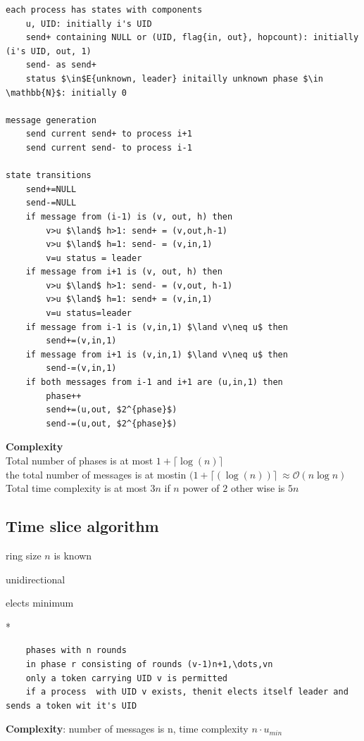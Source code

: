 \documentclass[ngerman,a4paper]{report}
\begin{document}
\begin{lstlisting}
each process has states with components
	u, UID: initially i's UID
	send+ containing NULL or (UID, flag{in, out}, hopcount): initially (i's UID, out, 1)
	send- as send+
	status $\in$E{unknown, leader} initailly unknown phase $\in \mathbb{N}$: initially 0

message generation
	send current send+ to process i+1
	send current send- to process i-1

state transitions
	send+=NULL
	send-=NULL
	if message from (i-1) is (v, out, h) then
		v>u $\land$ h>1: send+ = (v,out,h-1)
		v>u $\land$ h=1: send- = (v,in,1)
		v=u status = leader
	if message from i+1 is (v, out, h) then
		v>u $\land$ h>1: send- = (v,out, h-1)
		v>u $\land$ h=1: send+ = (v,in,1)
		v=u status=leader
	if message from i-1 is (v,in,1) $\land v\neq u$ then
		send+=(v,in,1)
	if message from i+1 is (v,in,1) $\land v\neq u$ then
		send-=(v,in,1)
	if both messages from i-1 and i+1 are (u,in,1) then
		phase++
		send+=(u,out, $2^{phase}$)
		send-=(u,out, $2^{phase}$)
\end{lstlisting}
\textbf{Complexity}\\
Total number of phases is at most $1+\lceil\log(n)\rceil$\\
the total number of messages is at mostin $(1+\lceil(\log(n))\rceil\ \approx \mathcal{O}(n\log n)$\\
Total time complexity is at most $3n$ if $n$ power of $2$ other wise is $5n$\\

\subsection{Time slice algorithm}
\begin{compactitem}
\item ring size $n$ is known
\item unidirectional
\item elects minimum
\end{compactitem}*


\begin{lstlisting}
	phases with n rounds
	in phase r consisting of rounds (v-1)n+1,\dots,vn
	only a token carrying UID v is permitted
	if a process  with UID v exists, thenit elects itself leader and sends a token wit it's UID

\end{lstlisting}
\textbf{Complexity}: number of messages is n, time complexity $n\cdot u_{min}$
\end{document}
